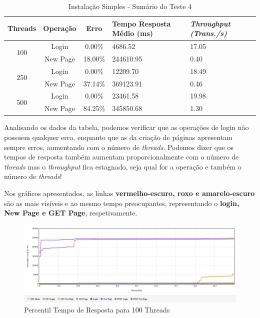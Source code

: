 \begin{table}[H]
\centering
\begin{tabular}{|c|c|c|p{3.5cm}|p{3cm}|}
\hline
Threads              & Operação & Erro    & Tempo Resposta Médio (ms) & \textit{Throughput (Trans./s)} \\ \hline
\multirow{2}{*}{100} & Login    & 0.00\%  & 4686.52                   & 17.05                          \\
                     & New Page & 18.00\% & 244610.95                 & 0.40                           \\ \hline
\multirow{2}{*}{250} & Login    & 0.00\%  & 12209.70                  & 18.49                          \\
                     & New Page & 37.14\% & 369123.91                 & 0.46                           \\ \hline
\multirow{2}{*}{500} & Login    & 0.00\%  & 23461.58                  & 19.98                          \\
                     & New Page & 84.25\% & 345850.68                 & 1.30                           \\ \hline
\end{tabular}
\caption{Instalação Simples - Sumário do Teste 4}
\end{table}

Analisando os dados da tabela, podemos verificar que as operações de login não possuem qualquer erro, enquanto que as da criação de páginas apresentam sempre erros, aumentando com o número de \textit{threads}. Podemos dizer que os tempos de resposta também aumentam proporcionalmente com o número de \textit{threads} mas o \textit{throughput} fica estagnado, seja qual for a operação e também o número de \textit{threads}!

Nos gráficos apresentados, as linhas \textbf{vermelho-escuro, roxo e amarelo-escuro} são as mais visíveis e ao mesmo tempo preocupantes, representando o \textbf{login, New Page e GET Page}, respetivamente. 

\begin{figure}[ht!]
    \centering
    \includegraphics[width=.9\linewidth]{img/testes/i-t4-100.png}
    \caption{Percentil Tempo de Resposta para 100 Threads}
\end{figure}

